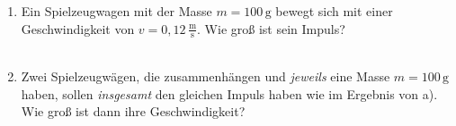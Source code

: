 \documentclass[task=1]{exercise}
\begin{document}
   \task[Impulserhaltung]
   \begin{enumerate}[label=\textnormal{\alph*)}]
    \item Ein Spielzeugwagen mit der Masse $m = 100\,\mathrm{g}$ bewegt sich mit einer Geschwindigkeit von $v = 0{,}12\,\frac{\mathrm{m}}{\mathrm{s}}$. Wie gro{\ss} ist sein Impuls?\\\vspace{.3cm}\\
    \item Zwei Spielzeugw\"agen, die zusammenh\"angen und \emph{jeweils} eine Masse $m = 100\,\mathrm{g}$ haben, sollen \emph{insgesamt} den gleichen Impuls haben wie im Ergebnis von a). Wie gro{\ss} ist dann ihre Geschwindigkeit?
   \end{enumerate}
\end{document}
